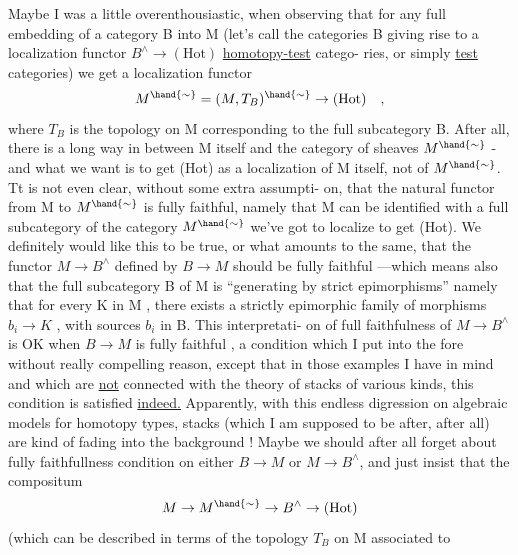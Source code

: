 
Maybe I was a little overenthousiastic, when observing that for
any full embedding of a category B into M (let's call the categories B
giving rise to a localization functor $B^\wedge \to (\mathrm{Hot})$ \uline{homotopy-test} catego-%
ries, or simply \uline{test} categories) we get a localization functor
\[ M^{\hand{\sim}} = (M,T_B)^{\hand{\sim}} \to (\mathrm{Hot}) \quad , \]
where $T_B$ is the topology on M corresponding to the full subcategory B.
After all, there is a long way in between M itself and the category of
sheaves $M^{\hand{\sim}}$ - and what we want is to get (Hot) as a localization of M
itself, not of $M^{\hand{\sim}}$. Tt is not even clear, without some extra assumpti-%
on, that the natural functor from M to $M^{\hand{\sim}}$ is fully faithful, namely
that M can be identified with a full subcategory of the category $M^{\hand{\sim}}$
we've got to localize to get (Hot). We definitely would like this to
be true, or what amounts to the same, that the functor $M \to B^\wedge$
defined by $B \to M$ should be fully faithful ---which means also that
the full subcategory B of M is ``generating by strict epimorphisms''
namely that for every K in M , there exists a strictly epimorphic
family of morphisms $b_i \to K$ , with sources $b_i$ in B. This interpretati-%
on of full faithfulness of $M \to B^\wedge$is OK when $B \to M$ is fully faithful ,
a condition which I  put into the fore without really compelling reason,
except that in those examples I have in mind and which are \uline{not} connected
with the theory of stacks of various kinds, this condition is satisfied
\margin{$\lrcorner\!\ulcorner$}\uline{indeed.}\hand{$\rfloor\!\lceil$} Apparently, with this endless digression on algebraic models
for homotopy types,  stacks (which I am supposed to be after, after
all) are kind of fading into the background ! Maybe we should after
all forget about fully faithfullness condition on either $B \to M$ or
$M \to B^\wedge$, and just insist that the compositum
\[ M \to M^{\hand{\sim}} \to B^\wedge \to (\mathrm{Hot}) \]
(which can be described  in terms of the topology $T_B$ on M associated to
